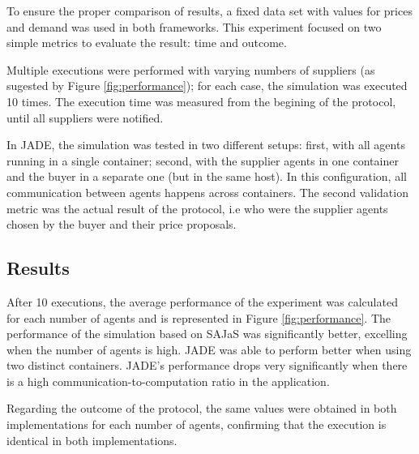 To ensure the proper comparison of results, a fixed data set with values for prices and demand was used in both frameworks. This experiment focused on two simple metrics to evaluate the result: time and outcome. 

Multiple executions were performed with varying numbers of suppliers (as sugested by Figure \ref{fig:performance}); for each case, the simulation was executed 10 times. The execution time was measured from the begining of the protocol, until all suppliers were notified.

In JADE, the simulation was tested in two different setups: first, with all agents running in a single container; second, with the supplier agents in one container and the buyer in a separate one (but in the same host). In this configuration, all communication between agents happens across containers. The second validation metric was the actual result of the protocol, i.e who were the supplier agents chosen by the buyer and their price proposals.

\subsection{Results}

After 10 executions, the average performance of the experiment was calculated for each number of agents and is represented in Figure \ref{fig:performance}. The performance of the simulation based on SAJaS was significantly better, excelling when the number of agents is high. JADE was able to perform better when using two distinct containers. JADE's performance drops very significantly when there is a high communication-to-computation ratio in the application\cite{mengistu2008scalability}.

Regarding the outcome of the protocol, the same values were obtained in both implementations for each number of agents, confirming that the execution is identical in both implementations.

